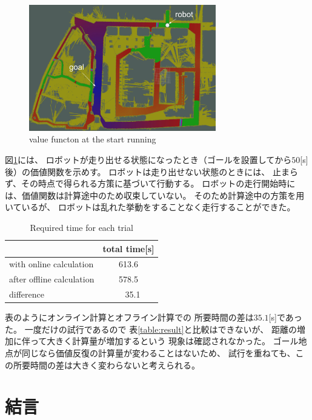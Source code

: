 \documentclass{jarticle}
\begin{document}
\begin{figure}[htb]
  \centering
   \includegraphics[height=55mm]{./figs/raspicat-value-function.png}
   \caption{value functon at the start running}
	\label{fig:raspicat-value-function}
\end{figure}

図\ref{fig:raspicat-value-function}には、
ロボットが走り出せる状態になったとき（ゴールを設置してから$50$[s]後）の価値関数を示めす。
ロボットは走り出せない状態のときには、
止まらず、その時点で得られる方策に基づいて行動する。
ロボットの走行開始時には、価値関数は計算途中のため収束していない。
そのため計算途中の方策を用いているが、
ロボットは乱れた挙動をすることなく走行することができた。

\begin{table}[hbtp]
	\caption{Required time for each trial}
	\label{table:result2}
	\centering
	\begin{small}
	 \begin{tabular}{l|c}
		\hline
		 & total time[s] \\
		\hline \hline
		with online calculation & 613.6 \\
		after offline calculation & 578.5 \\
		\hline
		 difference & \ \ 35.1 \\
		\hline
	 \end{tabular}
	\end{small}
\end{table}

表のようにオンライン計算とオフライン計算での
所要時間の差は$35.1$[s]であった。
一度だけの試行であるので
表\ref{table:result}と比較はできないが、
距離の増加に伴って大きく計算量が増加するという
現象は確認されなかった。
ゴール地点が同じなら価値反復の計算量が変わることはないため、
試行を重ねても、この所要時間の差は大きく変わらないと考えられる。

\section{結言}%
\end{document}
